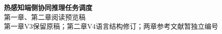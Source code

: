 

\frontmatter
\begin{center}
  {\Large\bfseries 热感知端侧协同推理任务调度}\\[8pt]
  {\large 第一章、第二章阅读预览稿}\\[5pt]
  {\small 第一章V3保留原稿；第二章V4语言结构修订；两章参考文献暂独立编号}
\end{center}
\vspace{10pt}
\tableofcontents
\mainmatter



